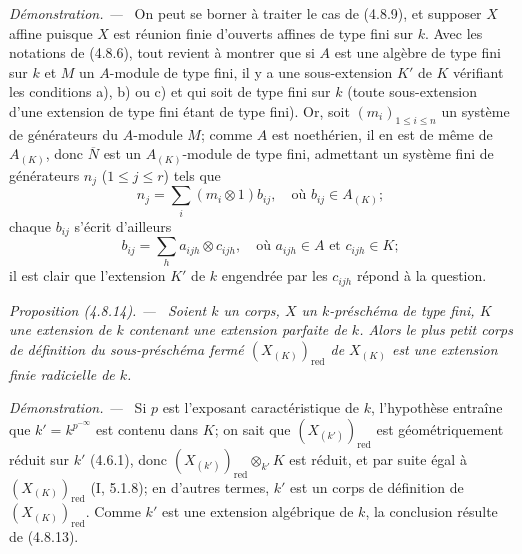 \documentclass[10pt,oneside]{book}
\newenvironment{proposition}[1][]{%
  \par\medskip\noindent\itshape Proposition (#1). ---\ }{\par}
\newenvironment{proof}{%
  \par\medskip\noindent\textit{Démonstration. ---\ }}{\par}
\begin{document}
\begin{proof}
On peut se borner à traiter le cas de (4.8.9), et supposer $X$ affine puisque
$X$ est réunion finie d'ouverts affines de type fini sur $k$. Avec les
notations de (4.8.6), tout revient à montrer que si $A$ est une algèbre de
type fini sur $k$ et $M$ un $A$-module de type fini, il y a une sous-extension
$K'$ de $K$ vérifiant les conditions a), b) ou c) et qui soit de type fini sur
$k$ (toute sous-extension d'une extension de type fini étant de type fini).
Or, soit $(m_i)_{1\leq i\leq n}$ un système de générateurs du $A$-module $M$;
comme $A$ est noethérien, il en est de même de $A_{(K)}$, donc $\overline N$
est un $A_{(K)}$-module de type fini, admettant un système fini de générateurs
$n_j$ ($1\leq j\leq r$) tels que
\[
n_j=\sum_i(m_i\otimes1)b_{ij},
\quad\text{où }b_{ij}\in A_{(K)};
\]
chaque $b_{ij}$ s'écrit d'ailleurs
\[
b_{ij}=\sum_h a_{ijh}\otimes c_{ijh},
\quad\text{où }a_{ijh}\in A\text{ et }c_{ijh}\in K;
\]
il est clair que l'extension $K'$ de $k$ engendrée par les $c_{ijh}$ répond à
la question.
\end{proof}

\begin{proposition}[4.8.14]
\label{IV.2.4.8.14-fr}
Soient $k$ un corps, $X$ un $k$-préschéma de type fini, $K$ une extension de
$k$ contenant une extension parfaite de $k$. Alors le plus petit corps de
définition du sous-préschéma fermé $(X_{(K)})_{\mathrm{red}}$ de $X_{(K)}$
est une extension finie radicielle de $k$.
\end{proposition}

\begin{proof}
Si $p$ est l'exposant caractéristique de $k$, l'hypothèse entraîne que
$k'=k^{p^{-\infty}}$ est contenu dans $K$; on sait que
$(X_{(k')})_{\mathrm{red}}$ est géométriquement réduit sur $k'$ (4.6.1), donc
$(X_{(k')})_{\mathrm{red}}\otimes_{k'}K$ est réduit, et par suite égal à
$(X_{(K)})_{\mathrm{red}}$ (I, 5.1.8); en d'autres termes, $k'$ est un corps
de définition de $(X_{(K)})_{\mathrm{red}}$. Comme $k'$ est une extension
algébrique de $k$, la conclusion résulte de (4.8.13).
\end{proof}
\end{document}
